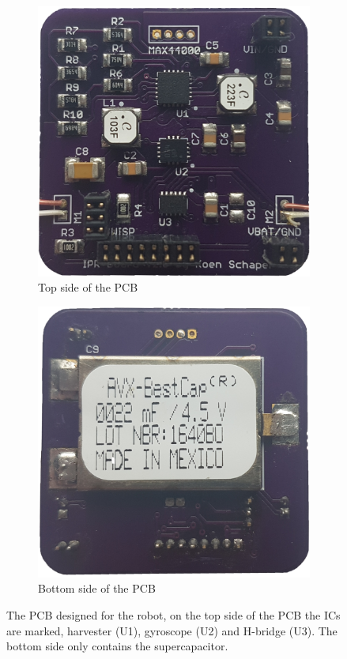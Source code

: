 \begin{figure}[h!]
	\centering
	\begin{subfigure}[b]{0.45\textwidth}
		\includegraphics[width=\textwidth]{pics/pcb_front.jpg}
		\caption{Top side of the PCB}
		\label{fig:pcb_robot_front}
	\end{subfigure}
	\qquad
	\begin{subfigure}[b]{0.45\textwidth}
		\includegraphics[width=\textwidth]{pics/pcb_back.jpg}
		\caption{Bottom side of the PCB}
		\label{fig:pcb_robot_back}
	\end{subfigure}
	\caption{The PCB designed for the robot, on the top side of the PCB the ICs are marked, harvester (U1), gyroscope (U2) and H-bridge (U3). The bottom side only contains the supercapacitor.}
	\label{fig:pcb_robot}
\end{figure}

